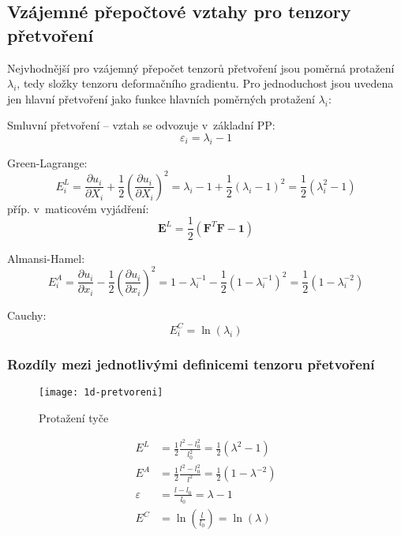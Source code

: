 
\subsection{Vzájemné přepočtové vztahy pro tenzory přetvoření}
Nejvhodnější pro vzájemný přepočet tenzorů přetvoření jsou poměrná protažení $\lambda_i$, tedy složky tenzoru deformačního gradientu. Pro jednoduchost jsou uvedena jen hlavní přetvoření jako funkce hlavních poměrných protažení $\lambda_i$:

Smluvní přetvoření -- vztah se odvozuje v~základní PP: 
\begin{equation}
	\varepsilon_i = \lambda_i - 1
\end{equation}

Green-Lagrange:
\begin{equation}
	E^L_i
	= \frac{\partial u_i}{\partial X_i} + \frac{1}{2} \left(\frac{\partial u_i}{\partial X_i}\right)^2
	= \lambda_i - 1 + \frac{1}{2} (\lambda_i - 1)^2
	= \frac{1}{2} (\lambda_i^2 - 1)
\end{equation}
příp. v~maticovém vyjádření:
\begin{equation}
	\bm{E}^L = \frac{1}{2} \left(\bm{F}^T \bm{F} - \bm{1}\right)
\end{equation}

Almansi-Hamel:
\begin{equation}
	E^A_i
	= \frac{\partial u_i}{\partial x_i} - \frac{1}{2} \left(\frac{\partial u_i}{\partial x_i}\right)^2
	= 1 - \lambda_i^{-1} - \frac{1}{2} (1 - \lambda_i^{-1})^2
	= \frac{1}{2} (1 - \lambda_i^{-2})
\end{equation}

Cauchy:
\begin{equation}
	E^C_i = \ln(\lambda_i)
\end{equation}

\subsubsection{Rozdíly mezi jednotlivými definicemi tenzoru přetvoření}
\begin{figure}[H]
	\centering
	\texttt{[image: 1d-pretvoreni]}
	\caption{Protažení tyče}
	\label{fig:1d-pretvoreni}
\end{figure}

\begin{align}
	E^L &= \frac{1}{2} \frac{l^2 - l_0^2}{l_0^2} = \frac{1}{2} (\lambda^2 - 1)\\
	E^A &= \frac{1}{2} \frac{l^2 - l_0^2}{l^2} = \frac{1}{2} (1 - \lambda^{-2})\\
	\varepsilon &= \frac{l - l_0}{l_0} = \lambda - 1\\
	E^C &= \ln\left(\frac{l}{l_0}\right) = \ln(\lambda)
\end{align}


